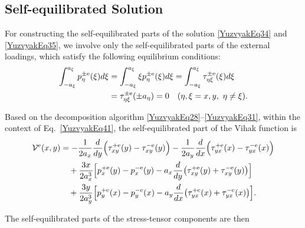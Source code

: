 \subsection{Self-equilibrated Solution} 

For constructing the self-equilibrated parts of the solution
\eqref{YuzvyakEq34} and \eqref{YuzvyakEq35}, 
we involve only the self-equilibrated parts of the external loadings, 
which satisfy the following equilibrium conditions:
\begin{align}
	\int_{-a_\xi}^{a_\xi} p_\eta^{\pm\mathrm e}(\xi) d\xi
	&= \int_{-a_\xi}^{a_\xi} \xi p_\eta^{\pm\mathrm e}(\xi) d\xi
	= \int_{-a_\xi}^{a_\xi} \tau_{\eta\xi}^{\pm\mathrm e}(\xi) d\xi
	\notag\\
	&= \tau_{\eta\xi}^{\pm\mathrm e}(\pm a_\eta)
	= 0
	\quad (\eta,\xi = x,y,\ \eta\neq\xi).
	\label{YuzvyakEq41}
\end{align}

Based on the decomposition algorithm 
\eqref{YuzvyakEq28}--\eqref{YuzvyakEq31}, 
within the context of Eq.~\eqref{YuzvyakEq41}, 
the self-equilibrated part of the Vihak function is
\begin{align}
	\mathcal V^{\mathrm e}(x,y)
	&= -\frac{1}{2a_x}\frac{d}{dy}\Bigl(
	\tau_{xy}^{+\mathrm e}(y)-\tau_{xy}^{-\mathrm e}(y)\Bigr)
	-\frac{1}{2a_y}\frac{d}{dx}\Bigl(
	\tau_{yx}^{+\mathrm e}(x)-\tau_{yx}^{-\mathrm e}(x)\Bigr)\notag\\
	&\quad +\frac{3x}{2a_x^3}\Bigl[
	p_x^{+\mathrm e}(y)-p_x^{-\mathrm e}(y)
	-a_x\frac{d}{dy}\bigl(\tau_{xy}^{+\mathrm e}(y)+\tau_{xy}^{-\mathrm e}(y)\bigr)
	\Bigr]\notag\\
	&\quad +\frac{3y}{2a_y^3}\Bigl[
	p_y^{+\mathrm e}(x)-p_y^{-\mathrm e}(x)
	-a_y\frac{d}{dx}\bigl(\tau_{yx}^{+\mathrm e}(x)+\tau_{yx}^{-\mathrm e}(x)\bigr)
	\Bigr].
	\label{YuzvyakEq42}
\end{align}

The self-equilibrated parts of the stress-tensor components are then


